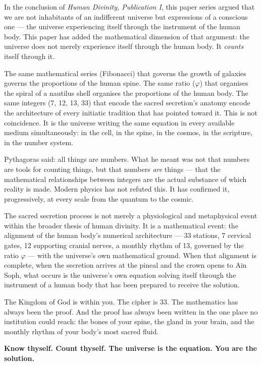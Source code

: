 \documentclass[12pt, a4paper]{article}
\begin{document}
In the conclusion of \emph{Human Divinity, Publication I}, this paper series argued that
we are not inhabitants of an indifferent universe but expressions of a
conscious one — the universe experiencing itself through the instrument of the
human body. This paper has added the mathematical dimension of that argument:
the universe does not merely experience itself through the human body. It
\emph{counts} itself through it.

The same mathematical series (Fibonacci) that governs the growth of galaxies
governs the proportions of the human spine. The same ratio ($\varphi$) that
organises the spiral of a nautilus shell organises the proportions of the human
body. The same integers (7, 12, 13, 33) that encode the sacred secretion's
anatomy encode the architecture of every initiatic tradition that has pointed
toward it. This is not coincidence. It is the universe writing the same
equation in every available medium simultaneously: in the cell, in the spine,
in the cosmos, in the scripture, in the number system.

Pythagoras said: all things are numbers. What he meant was not that numbers are
tools for counting things, but that numbers \emph{are} things — that the
mathematical relationships between integers are the actual substance of which
reality is made. Modern physics has not refuted this. It has confirmed it,
progressively, at every scale from the quantum to the cosmic.

The sacred secretion process is not merely a physiological and metaphysical
event within the broader thesis of human divinity. It is a mathematical event:
the alignment of the human body's numerical
architecture — 33 stations, 7 cervical gates, 12 supporting cranial nerves,
a monthly rhythm of 13, governed by the ratio $\varphi$ — with the universe's
own mathematical ground. When that alignment is complete, when the secretion
arrives at the pineal and the crown opens to Ain Soph, what occurs is the
universe's own equation solving itself through the instrument of a human body
that has been prepared to receive the solution.

The Kingdom of God is within you. The cipher is 33. The mathematics has always
been the proof. And the proof has always been written in the one place no
institution could reach: the bones of your spine, the gland in your brain, and
the monthly rhythm of your body's most sacred fluid.

\vspace{1.5em}
\noindent\textbf{Know thyself. Count thyself. The universe is the equation.
You are the solution.}

\newpage
\printbibliography[title={Bibliography}]
\end{document}
